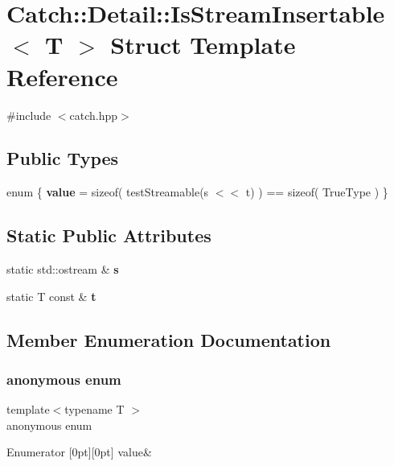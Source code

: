 \section{Catch\+:\+:Detail\+:\+:Is\+Stream\+Insertable$<$ T $>$ Struct Template Reference}
\label{struct_catch_1_1_detail_1_1_is_stream_insertable}


{\ttfamily \#include $<$catch.\+hpp$>$}

\subsection*{Public Types}
\begin{DoxyCompactItemize}
\item 
enum \{ \textbf{ value} = sizeof( test\+Streamable(s $<$$<$ t) ) == sizeof( True\+Type )
 \}
\end{DoxyCompactItemize}
\subsection*{Static Public Attributes}
\begin{DoxyCompactItemize}
\item 
static std\+::ostream \& \textbf{ s}
\item 
static T const  \& \textbf{ t}
\end{DoxyCompactItemize}


\subsection{Member Enumeration Documentation}
\mbox{\label{struct_catch_1_1_detail_1_1_is_stream_insertable_a2e4508694da3bf368ff67733a7970edd}} 
\subsubsection{anonymous enum}
{\footnotesize\ttfamily template$<$typename T $>$ \\
anonymous enum}

\begin{DoxyEnumFields}{Enumerator}
[0pt][0pt]{}\mbox{\label{struct_catch_1_1_detail_1_1_is_stream_insertable_a2e4508694da3bf368ff67733a7970edda765a324929702bfce2969fc19fc4f926}} 
value&\\
\hline

\end{DoxyEnumFields}



